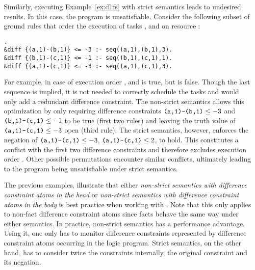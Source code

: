 \begin{example}
Similarly, executing Example~\ref{ex:dl:fs} with strict semantics leads to undesired results.
In this case, the program is unsatisfiable.
Consider the following subset of ground rules that order the execution of tasks ,  and  on resource :
\begin{lstlisting}[numbers=none].
&diff {(a,1)-(b,1)} <= -3 :- seq((a,1),(b,1),3).
&diff {(b,1)-(c,1)} <= -1 :- seq((b,1),(c,1),1).
&diff {(a,1)-(c,1)} <= -3 :- seq((a,1),(c,1),3).
\end{lstlisting}
For example, in case of execution order , 
 and  is true,
but  is false.
Though the last sequence is implied, it is not needed to correctly schedule the tasks and would only add a redundant difference constraint.
The non-strict semantics allows this optimization 
by only requiring difference constraints $\texttt{(a,1)-(b,1)}\leq -3$ and $\texttt{(b,1)-(c,1)}\leq -1$ to be true (first two rules)
and leaving the truth value of $\texttt{(a,1)-(c,1)}\leq -3$ open (third rule). 
The strict semantics, however, enforces the negation of $\texttt{(a,1)-(c,1)}\leq -3$, $\texttt{(a,1)-(c,1)}\leq 2$, to hold.
This constitutes a conflict with the first two difference constraints and therefore excludes execution order .
Other possible permutations encounter similar conflicts, ultimately leading to the program being unsatisfiable under strict semantics.
\end{example}

The previous examples, illustrate that either \emph{non-strict semantics with difference constraint atoms in the head} or
\emph{non-strict semantics with difference constraint atoms in the body} is best practice when working with .
Note that this only applies to non-fact difference constraint atoms since facts behave the same way under either semantics.
In practice, non-strict semantics has a performance advantage.
Using it, one only has to monitor difference constraints represented by difference constraint atoms occurring in the logic program.
Strict semantics, on the other hand, has to consider twice the constraints internally, the original constraint and its negation.

